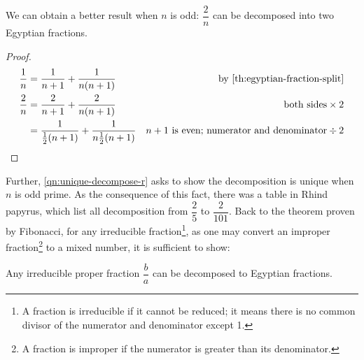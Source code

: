 \documentclass[b5paper]{article}
\begin{document}
We can obtain a better result when $n$ is odd: $\dfrac{2}{n}$ can be decomposed into two Egyptian fractions.

\begin{proof}
  \begin{align*}
    \frac{1}{n} &= \frac{1}{n+1} + \frac{1}{n(n+1)} & \text{by \cref{th:egyptian-fraction-split}} & \\
    \frac{2}{n} &= \frac{2}{n+1} + \frac{2}{n(n+1)} & \text{both sides} \times 2 & \\
                &= \frac{1}{\frac{1}{2}(n+1)} + \frac{1}{n\frac{1}{2}(n+1)} & n + 1\text{ is even; numerator and denominator} \div 2 &\qedhere
  \end{align*}
\end{proof}

Further, \cref{qn:unique-decompose-r} asks to show the decomposition is unique when $n$ is odd prime. As the consequence of this fact, there was a table in Rhind papyrus, which list all decomposition from $\dfrac{2}{5}$ to $\dfrac{2}{101}$. Back to the theorem proven by Fibonacci, for any irreducible fraction\footnote{A fraction is irreducible if it cannot be reduced; it means there is no common divisor of the numerator and denominator except 1.}, as one may convert an improper fraction\footnote{A fraction is improper if the numerator is greater than its denominator.} to a mixed number, it is sufficient to show:

\begin{theorem}[Fibonacci]
Any irreducible proper fraction $\dfrac{b}{a}$ can be decomposed to Egyptian fractions.
\end{theorem}
\end{document}
